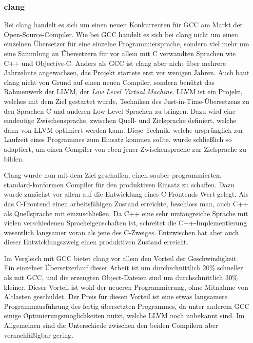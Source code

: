\subsubsection{clang}
Bei clang handelt es sich um einen neuen Konkurrenten für GCC am Markt der Open-Source-Compiler. Wie bei GCC handelt es sich bei clang nicht um einen einzelnen Übersetzer für eine einzelne Programmiersprache,
sondern viel mehr um eine Sammlung an Übersetzern für vor allem mit C verwandten Sprachen wie C++ und Objective-C. Anders als GCC ist clang aber nicht über mehrere Jahrzehnte angewachsen, das Projekt
startete erst vor wenigen Jahren. Auch baut clang nicht von Grund auf einen neuen Compiler, sondern benützt das Rahmenwerk der LLVM, der \textit{Low Level Virtual Machine}. LLVM ist ein Projekt, welches
mit dem Ziel gestartet wurde, Techniken des Just-in-Time-Übersetzens zu den Sprachen C und anderen Low-Level-Sprachen zu bringen. Dazu wird eine eindeutige Zwischensprache, zwischen Quell- und Zielsprache
definiert, welche dann von LLVM optimiert werden kann. Diese Technik, welche ursprünglich zur Laufzeit eines Programmes zum Einsatz kommen sollte, wurde schließlich so adaptiert, um einen Compiler von
eben jener Zwischensprache zur Zielsprache zu bilden. 

Clang wurde nun mit dem Ziel geschaffen, einen sauber programmierten, standard-konformen Compiler für den produktiven Einsatz zu schaffen. Dazu wurde zunächst vor allem auf die Entwicklung eines C-Frontends
Wert gelegt. Als das C-Frontend einen arbeitsfähigen Zustand erreichte, beschloss man, auch C++ als Quellsprache mit einzuschließen. Da C++ eine sehr umfangreiche Sprache mit vielen verschiedenen Spracheigenschaften 
ist, schreitet die C++-Implementierung wesentlich langsamer voran als jene des C-Zweiges. Entzwischen hat aber auch dieser Entwicklungszweig einen produktiven Zustand erreicht. 

Im Vergleich mit GCC bietet clang vor allem den Vorteil der Geschwindigkeit. Ein einzelner Übersetzerlauf dieser Arbeit ist um durchschnittlich 20\% schneller als mit GCC, und die erzeugten Object-Dateien
sind um durchschnittlich 30\% kleiner. Dieser Vorteil ist wohl der neueren Programmierung, ohne Mitnahme von Altlasten geschuldet. Der Preis für diesen Vorteil ist eine etwas langsamere Programmausführung
des fertig übersetzten Programmes, da unter anderem GCC einige Optimierungsmöglichkeiten nutzt, welche LLVM noch unbekannt sind. Im Allgemeinen sind die Unterschiede zwischen den beiden Compilern aber
vernachläßigbar gering.


